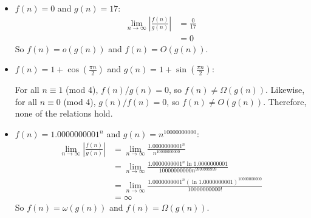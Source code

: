 \documentclass[12pt,twoside]{article}
\begin{document}
\begin{problem}{20}
{\begin{itemize}
\item $f(n) = 0$ and $g(n) = 17$:
\begin{align*}
   	\lim_{n\to\infty} \left|\frac{f(n)}{g(n)}\right|
	&= \frac{0}{17} \\
	&= 0
  \end{align*}
	 So $f(n) = o(g(n))$ and $f(n) = O(g(n))$.

\item $f(n) = 1+\cos\left(\frac{\pi n}{2}\right)$ and $g(n) = 1+\sin\left(\frac{\pi n}{2}\right)$:

	For all $n \equiv 1$ (mod 4), $f(n)/g(n) = 0$, so $f(n) \not= \Omega(g(n))$. Likewise, for all $n \equiv 0$ (mod 4), 
$g(n)/f(n) = 0$, so $f(n) \not= O(g(n))$. Therefore, none of the relations hold.

\item $f(n) = {1.0000000001}^n$ and $g(n) = n^{10000000000}$:
\begin{align*}
   	\lim_{n\to\infty} \left|\frac{f(n)}{g(n)}\right|
	&= \lim_{n\to\infty} \frac{1.0000000001^n}{n^{10000000000}} \\
	&= \lim_{n\to\infty} \frac{1.0000000001^n \ln 1.0000000001}{10000000000n^{9999999999}} \\
	&= \lim_{n\to\infty} \frac{1.0000000001^n (\ln 1.0000000001)^{10000000000}}{10000000000!} \\
	&= \infty
  \end{align*}
	 So $f(n) = \omega(g(n))$ and $f(n) = \Omega(g(n))$.

	
 \end{itemize}

}


\end{problem}
\end{document}
